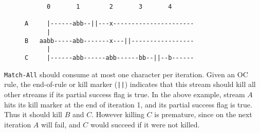 \begin{figure}[h]
\begin{center}
\begin{BVerbatim}
      0       1        2       3       4

A     |------abb--||---x----------------------
      |
B   aabb-----abb-------x---||-----------------
      |
C     |------abb------abb------bb--||--b------
\end{BVerbatim}
\end{center}
\end{figure}

\texttt{Match-All} should consume at most one character per iteration.  Given
an OC rule, the end-of-rule or kill marker (\texttt{||}) indicates that this stream
should kill all other streams if its partial success flag is true.  In the
above example, stream $A$ hits its kill marker at the end of iteration 1, and
its partial success flag is true. Thus it should kill $B$ and $C$.  However
killing $C$ is premature, since on the next iteration $A$ will fail, and $C$
would succeed if it were not killed.
